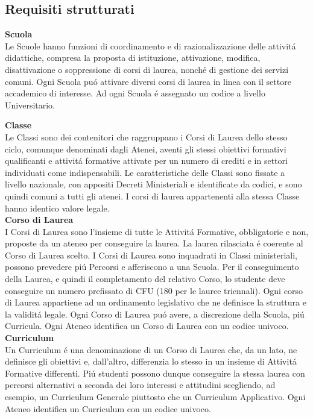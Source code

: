 \documentclass[a4paper,12pt,italian,towside]{article}
\begin{document}
\subsection{Requisiti strutturati}

\hspace{0.6cm}\textbf{Scuola}\\
Le Scuole hanno funzioni di coordinamento e di razionalizzazione delle attivit\'a didattiche, compresa la proposta di istituzione, attivazione, modifica, disattivazione o soppressione di corsi di laurea, nonch\'e di gestione dei servizi comuni. Ogni Scuola pu\'o attivare diversi corsi di laurea in linea con il settore accademico di interesse. Ad ogni Scuola \'e assegnato un codice a livello Universitario.
\newline

\textbf{Classe}\\
Le Classi sono dei contenitori che raggruppano i Corsi di Laurea dello stesso ciclo, comunque denominati dagli Atenei, aventi gli stessi obiettivi formativi qualificanti e attivit\'a formative attivate per un numero di crediti e in settori individuati come indispensabili. Le caratteristiche delle Classi sono fissate a livello nazionale, con appositi Decreti Ministeriali e identificate da codici, e sono quindi comuni a tutti gli atenei. I corsi di laurea appartenenti alla stessa Classe hanno identico valore legale.
\\

\textbf{Corso di Laurea}\\
I Corsi di Laurea sono l'insieme di tutte le Attivit\'a Formative, obbligatorie e non, proposte da un ateneo per conseguire la laurea. La laurea rilasciata \'e coerente al Corso di Laurea scelto. I Corsi di Laurea sono inquadrati in Classi ministeriali, possono prevedere pi\'u Percorsi e afferiscono a una Scuola. Per il conseguimento della Laurea, e quindi il completamento del relativo Corso, lo studente deve conseguire un numero prefissato di CFU (180 per le lauree triennali). Ogni corso di Laurea appartiene ad un ordinamento legislativo che ne definisce la struttura e la validit\'a legale. Ogni Corso di Laurea pu\'o avere, a discrezione della Scuola, pi\'u Curricula. Ogni Ateneo identifica un Corso di Laurea con un codice univoco.\\


\textbf{Curriculum}\\
Un Curriculum \'e una denominazione di un Corso di Laurea che, da un lato, ne definisce gli obiettivi e, dall'altro, differenzia lo stesso in un insieme di Attivit\'a Formative differenti. Pi\'u studenti possono dunque conseguire la stessa laurea con percorsi alternativi a seconda dei loro interessi e attitudini scegliendo, ad esempio, un Curriculum Generale piuttosto che un Curriculum Applicativo.
Ogni Ateneo identifica un Curriculum con un codice univoco.\\
\end{document}
